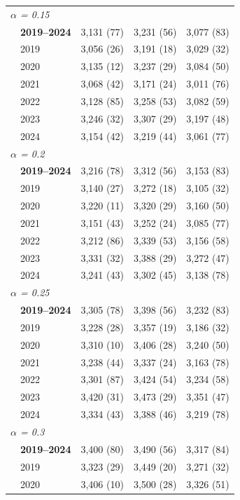\begin{table}[htbp]
\begin{tabular}{llrrr}
\midrule
\multicolumn{5}{l}{\textit{$\alpha$ = 0.15}} \\
 & \textbf{2019–2024} & 3,131 (77) & 3,231 (56) & 3,077 (83) \\
 & 2019 & 3,056 (26) & 3,191 (18) & 3,029 (32) \\
 & 2020 & 3,135 (12) & 3,237 (29) & 3,084 (50) \\
 & 2021 & 3,068 (42) & 3,171 (24) & 3,011 (76) \\
 & 2022 & 3,128 (85) & 3,258 (53) & 3,082 (59) \\
 & 2023 & 3,246 (32) & 3,307 (29) & 3,197 (48) \\
 & 2024 & 3,154 (42) & 3,219 (44) & 3,061 (77) \\
\midrule
\multicolumn{5}{l}{\textit{$\alpha$ = 0.2}} \\
 & \textbf{2019–2024} & 3,216 (78) & 3,312 (56) & 3,153 (83) \\
 & 2019 & 3,140 (27) & 3,272 (18) & 3,105 (32) \\
 & 2020 & 3,220 (11) & 3,320 (29) & 3,160 (50) \\
 & 2021 & 3,151 (43) & 3,252 (24) & 3,085 (77) \\
 & 2022 & 3,212 (86) & 3,339 (53) & 3,156 (58) \\
 & 2023 & 3,331 (32) & 3,388 (29) & 3,272 (47) \\
 & 2024 & 3,241 (43) & 3,302 (45) & 3,138 (78) \\
\midrule
\multicolumn{5}{l}{\textit{$\alpha$ = 0.25}} \\
 & \textbf{2019–2024} & 3,305 (78) & 3,398 (56) & 3,232 (83) \\
 & 2019 & 3,228 (28) & 3,357 (19) & 3,186 (32) \\
 & 2020 & 3,310 (10) & 3,406 (28) & 3,240 (50) \\
 & 2021 & 3,238 (44) & 3,337 (24) & 3,163 (78) \\
 & 2022 & 3,301 (87) & 3,424 (54) & 3,234 (58) \\
 & 2023 & 3,420 (31) & 3,473 (29) & 3,351 (47) \\
 & 2024 & 3,334 (43) & 3,388 (46) & 3,219 (78) \\
\midrule
\multicolumn{5}{l}{\textit{$\alpha$ = 0.3}} \\
 & \textbf{2019–2024} & 3,400 (80) & 3,490 (56) & 3,317 (84) \\
 & 2019 & 3,323 (29) & 3,449 (20) & 3,271 (32) \\
 & 2020 & 3,406 (10) & 3,500 (28) & 3,326 (51) \\

\end{tabular}
\end{table}

